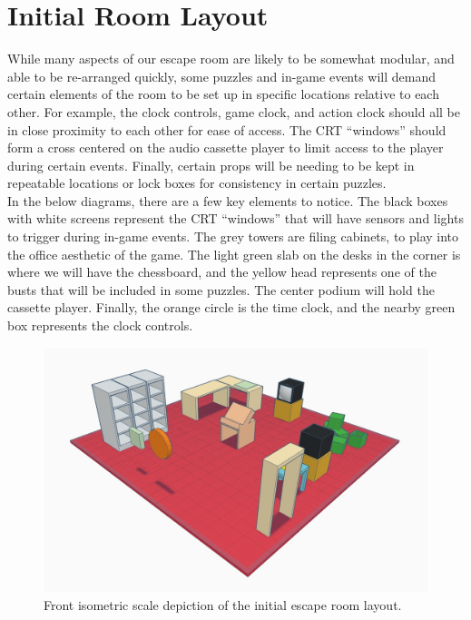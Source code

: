 \documentclass[conference]{IEEEtran}
\begin{document}
\section{Initial Room Layout}
While many aspects of our escape room are likely to be somewhat modular, and able to be re-arranged quickly,
some puzzles and in-game events will demand certain elements of the room to be set up in specific locations relative
to each other. For example, the clock controls, game clock, and action clock should all be in close proximity to each
other for ease of access. The CRT ``windows'' should form a cross centered on the audio cassette player to limit
access to the player during certain events. Finally, certain props will be needing to be kept in repeatable
locations or lock boxes for consistency in certain puzzles.
\\
\indent In the below diagrams, there are a few key elements to notice. The black boxes with white screens
represent the CRT ``windows'' that will have sensors and lights to trigger during in-game events. The
grey towers are filing cabinets, to play into the office aesthetic of the game. The light green slab on the
desks in the corner is where we will have the chessboard, and the yellow head represents one of the busts
that will be included in some puzzles. The center podium will hold the cassette player. Finally, the orange circle
is the time clock, and the nearby green box represents the clock controls.

\begin{figure}[ht]
    \centering
    \includegraphics[width=0.90\columnwidth]{Images/EscapeRoomIsoFront.jpg}
    \caption{Front isometric scale depiction of the initial escape room layout.}
\end{figure}
\end{document}
